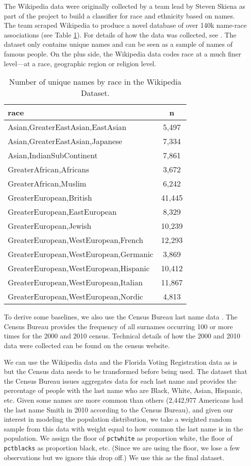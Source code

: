 \documentclass[12pt, letterpaper]{article}
\begin{document}
The Wikipedia data were originally collected by a team lead by Steven Skiena as part of the project to build a classifier for race and ethnicity based on names. The team scraped Wikipedia to produce a novel database of over 140k name-race associations (see Table \ref{table:wikipedia_data}). For details of how the data was collected, see \citet{ambekar2009name}. The dataset only contains unique names and can be seen as a sample of names of famous people. On the plus side, the Wikipedia data codes race at a much finer level---at a race, geographic region or religion level. 

\begin{table}[h!]
\centering
\caption{Number of unique names by race in the Wikipedia Dataset.}
\begin{tabular}{ l c }
\hline    
race & n \\
\hline
Asian,GreaterEastAsian,EastAsian & 5,497 \\
Asian,GreaterEastAsian,Japanese & 7,334 \\
Asian,IndianSubContinent & 7,861 \\
GreaterAfrican,Africans & 3,672 \\
GreaterAfrican,Muslim & 6,242 \\
GreaterEuropean,British & 41,445 \\
GreaterEuropean,EastEuropean & 8,329 \\
GreaterEuropean,Jewish & 10,239 \\
GreaterEuropean,WestEuropean,French & 12,293 \\
GreaterEuropean,WestEuropean,Germanic & 3,869 \\
GreaterEuropean,WestEuropean,Hispanic & 10,412 \\
GreaterEuropean,WestEuropean,Italian & 11,867 \\
GreaterEuropean,WestEuropean,Nordic & 4,813 \\
\hline
\end{tabular}
\label{table:wikipedia_data}
\end{table}

To derive some baselines, we also use the Census Bureau last name data \citep{census2010}. The Census Bureau provides the frequency of all surnames occurring 100 or more times for the 2000 and 2010 census. Technical details of how the 2000 and 2010 data were collected can be found on the census website. 

We can use the Wikipedia data and the Florida Voting Registration data as is but the Census data needs to be transformed before being used. The dataset that the Census Bureau issues aggregates data for each last name and provides the percentage of people with the last name who are Black, White, Asian, Hispanic, etc. Given some names are more common than others (2,442,977 Americans had the last name Smith in 2010 according to the Census Bureau), and given our interest in modeling the population distribution, we take a weighted random sample from this data with weight equal to how common the last name is in the population. We assign the floor of \texttt{pctwhite} as proportion white, the floor of \texttt{pctblacks} as proportion black, etc. (Since we are using the floor, we lose a few observations but we ignore this drop off.) We use this as the final dataset.
\end{document}
